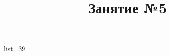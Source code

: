 \documentclass[12pt, a4paper]{article}
\begin{document}
	\title{Занятие №5}
	{list_39}
\end{document}
